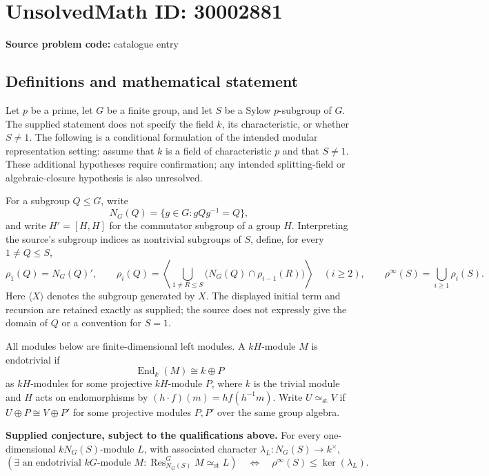 \documentclass[11pt]{article}
\begin{document}
\section*{UnsolvedMath ID: 30002881}
\textbf{Source problem code:} catalogue entry
\subsection{Definitions and mathematical statement}
Let \(p\) be a prime, let \(G\) be a finite group, and let \(S\) be a Sylow \(p\)-subgroup of \(G\). The supplied statement does not specify the field \(k\), its characteristic, or whether \(S\ne 1\). The following is a conditional formulation of the intended modular representation setting: assume that \(k\) is a field of characteristic \(p\) and that \(S\ne 1\). These additional hypotheses require confirmation; any intended splitting-field or algebraic-closure hypothesis is also unresolved.

For a subgroup \(Q\le G\), write
\[
N_G(Q)=\{g\in G:gQg^{-1}=Q\},
\]
and write \(H'=[H,H]\) for the commutator subgroup of a group \(H\). Interpreting the source's subgroup indices as nontrivial subgroups of \(S\), define, for every \(1\ne Q\le S\),
\[
\rho_1(Q)=N_G(Q)',\qquad
\rho_i(Q)=\left\langle\bigcup_{1\ne R\le S}\bigl(N_G(Q)\cap\rho_{i-1}(R)\bigr)\right\rangle
\quad(i\ge2),
\qquad
\rho^\infty(S)=\bigcup_{i\ge1}\rho_i(S).
\]
Here \(\langle X\rangle\) denotes the subgroup generated by \(X\). The displayed initial term and recursion are retained exactly as supplied; the source does not expressly give the domain of \(Q\) or a convention for \(S=1\).

All modules below are finite-dimensional left modules. A \(kH\)-module \(M\) is endotrivial if
\[
\operatorname{End}_k(M)\cong k\oplus P
\]
as \(kH\)-modules for some projective \(kH\)-module \(P\), where \(k\) is the trivial module and \(H\) acts on endomorphisms by \((h\cdot f)(m)=h f(h^{-1}m)\). Write \(U\simeq_{\mathrm{st}}V\) if \(U\oplus P\cong V\oplus P'\) for some projective modules \(P,P'\) over the same group algebra.

\textbf{Supplied conjecture, subject to the qualifications above.} For every one-dimensional \(kN_G(S)\)-module \(L\), with associated character \(\lambda_L:N_G(S)\to k^\times\),
\[
\left(\exists\text{ an endotrivial }kG\text{-module }M:
\operatorname{Res}^{G}_{N_G(S)}M\simeq_{\mathrm{st}}L\right)
\quad\Longleftrightarrow\quad
\rho^\infty(S)\le\ker(\lambda_L).
\]
\end{document}
